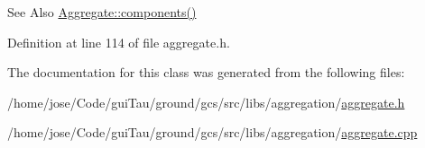 \begin{DoxySeeAlso}{See Also}
\hyperlink{class_aggregation_1_1_aggregate_ad2189eec2b5f725c0a0db81d5fbf3e25}{Aggregate\-::components()} 
\end{DoxySeeAlso}


Definition at line 114 of file aggregate.\-h.



The documentation for this class was generated from the following files\-:\begin{DoxyCompactItemize}
\item 
/home/jose/\-Code/gui\-Tau/ground/gcs/src/libs/aggregation/\hyperlink{aggregate_8h}{aggregate.\-h}\item 
/home/jose/\-Code/gui\-Tau/ground/gcs/src/libs/aggregation/\hyperlink{aggregate_8cpp}{aggregate.\-cpp}\end{DoxyCompactItemize}
